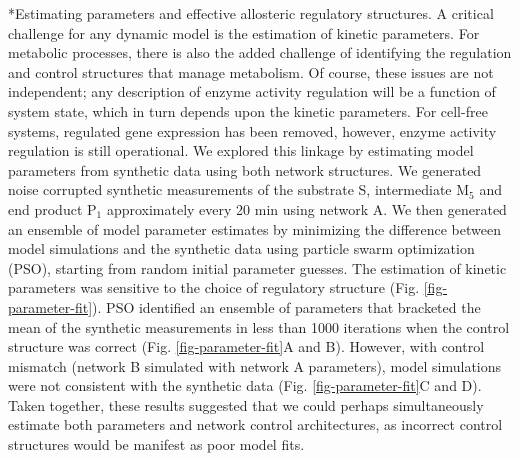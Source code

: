 \documentclass[12pt]{article}
\makeatletter
\renewcommand\subsection{\@startsection
	{subsection}{2}{0mm}
	{-0.05in}
	{-0.5\baselineskip}
	{\normalfont\normalsize\bfseries}}
\makeatother
\begin{document}
\subsection*{Estimating parameters and effective allosteric regulatory structures.}
A critical challenge for any dynamic model is the estimation of kinetic parameters. 
For metabolic processes, there is also the added challenge of identifying the regulation and control structures that manage metabolism. 
Of course, these issues are not independent; any description of enzyme activity regulation will be a function of system state, which in turn depends upon the kinetic parameters. 
For cell-free systems, regulated gene expression has been removed, however, enzyme activity regulation is still operational. 
We explored this linkage by estimating model parameters from synthetic data using both network structures. 
We generated noise corrupted synthetic measurements of the substrate S, intermediate M$_{5}$ and end product P$_1$ approximately every 20 min using
network A. We then generated an ensemble of model parameter estimates by minimizing the difference between model simulations and the synthetic data using particle swarm optimization (PSO), starting from random initial parameter guesses. The estimation of kinetic parameters was sensitive to the choice of regulatory structure (Fig. \ref{fig-parameter-fit}). 
PSO identified an ensemble of parameters that bracketed the mean of the synthetic measurements in less than 1000 iterations when the control structure was correct (Fig. \ref{fig-parameter-fit}A and B). 
However, with control mismatch (network B simulated with network A parameters), model simulations were not consistent with the synthetic data  (Fig. \ref{fig-parameter-fit}C and D). 
Taken together, these results suggested that we could perhaps simultaneously estimate both parameters and network control architectures, as incorrect control structures would be manifest as poor model fits.
\end{document}

